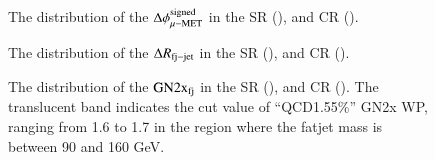     \begin{figure}[htbp]
        \centering
        \caption{
            The distribution of the $\Delta\phi^\mathrm{signed}_\mathrm{\mu-MET}$ in the SR (\protect{}), and CR (\protect{}).
        }
        \label{fig:dPhi_mu_met}
    \end{figure}

    \begin{figure}[htbp]
        \centering
        \caption{
            The distribution of the $\Delta R_\mathrm{fj-jet}$ in the SR (\protect{}), and CR (\protect{}).
        }
        \label{fig:dR_jfj}
    \end{figure}

    \begin{figure}[htbp]
        \centering
        \caption{
            The distribution of the $\mathrm{GN2x}_\mathrm{fj}$ in the SR (\protect{}), and CR (\protect{}). 
            The translucent band indicates the cut value of ``QCD1.55\%'' GN2x WP, ranging from 1.6 to 1.7 in the region where the fatjet mass is between 90 and 160 GeV.
        }
        \label{fig:GN2bb}
    \end{figure}

